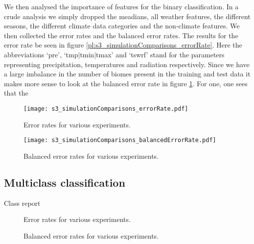We then analysed the importance of features for the binary classification.
In a crude analysis we simply dropped the meadians, all weather features, the different seasons,
the different climate data categories and 
the non-climate features. We then collected the error rates and the balanced error rates. 
The results for the error rate be seen in figure \ref{pl:s3_simulationComparisons_errorRate}.
Here the abbreviations `pre', `tmp$|$tmin$|$tmax' and `tswrf' stand for the parameters representing
precipitation, temperatures and radiation respectively.
Since we have a large imbalance in the number of biomes present in the training and test data it makes more sense to 
look at the balanced error rate in figure \ref{pl:s3_simulationComparisons_balancedErrorRate}.
For one, one sees that the 

\begin{figure}[h]
  \centering
  \begin{minipage}{0.45\textwidth}
    \centering
    \texttt{[image: s3\_simulationComparisons\_errorRate.pdf]}
    \caption{Error rates for various experiments.}
    \label{pl:s3_simulationComparisons_errorRate}
  \end{minipage}
  \hfill
  \begin{minipage}{0.45\textwidth}
    \centering
    \texttt{[image: s3\_simulationComparisons\_balancedErrorRate.pdf]}
    \caption{Balanced error rates for various experiments.}
    \label{pl:s3_simulationComparisons_balancedErrorRate}
  \end{minipage}
\end{figure}


\subsection{Multiclass classification}



\begin{table}[h]
  \centering
  
  \caption{Class report}
  \label{tb:s4_basic_classreport}
\end{table}

\begin{figure}[h]
  \centering
  \begin{minipage}{0.45\textwidth}
    \centering
    \missingfigure[figwidth=\textwidth]{}
    \caption{Error rates for various experiments.}
    \label{pl:s4_simulationComparisons_errorRate}
  \end{minipage}
  \hfill
  \begin{minipage}{0.45\textwidth}
    \centering
    \missingfigure[figwidth=\textwidth]{}
    \caption{Balanced error rates for various experiments.}
    \label{pl:s4_simulationComparisons_balancedErrorRate}
  \end{minipage}
\end{figure}

